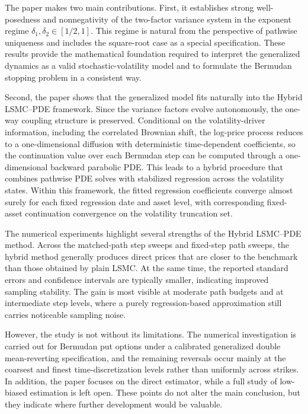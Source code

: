 \documentclass[10pt]{article}
\theoremstyle{plain}
\theoremstyle{definition}
\theoremstyle{remark}
\begin{document}
The paper makes two main contributions. First, it establishes strong well-posedness and nonnegativity of the two-factor variance system in the exponent regime $\delta_1, \delta_2 \in [1/2,1]$. This regime is natural from the perspective of pathwise uniqueness and includes the square-root case as a special specification. These results provide the mathematical foundation required to interpret the generalized dynamics as a valid stochastic-volatility model and to formulate the Bermudan stopping problem in a consistent way.

Second, the paper shows that the generalized model fits naturally into the Hybrid LSMC--PDE framework. Since the variance factors evolve autonomously, the one-way coupling structure is preserved. Conditional on the volatility-driver information, including the correlated Brownian shift, the log-price process reduces to a one-dimensional diffusion with deterministic time-dependent coefficients, so the continuation value over each Bermudan step can be computed through a one-dimensional backward parabolic PDE. This leads to a hybrid procedure that combines pathwise PDE solves with stabilized regression across the volatility states. Within this framework, the fitted regression coefficients converge almost surely for each fixed regression date and asset level, with corresponding fixed-asset continuation convergence on the volatility truncation set.

The numerical experiments highlight several strengths of the Hybrid LSMC--PDE method. Across the matched-path step sweeps and fixed-step path sweeps, the hybrid method generally produces direct prices that are closer to the benchmark than those obtained by plain LSMC. At the same time, the reported standard errors and confidence intervals are typically smaller, indicating improved sampling stability. The gain is most visible at moderate path budgets and at intermediate step levels, where a purely regression-based approximation still carries noticeable sampling noise.

However, the study is not without its limitations. The numerical investigation is carried out for Bermudan put options under a calibrated generalized double mean-reverting specification, and the remaining reversals occur mainly at the coarsest and finest time-discretization levels rather than uniformly across strikes. In addition, the paper focuses on the direct estimator, while a full study of low-biased estimation is left open. These points do not alter the main conclusion, but they indicate where further development would be valuable.
\end{document}
